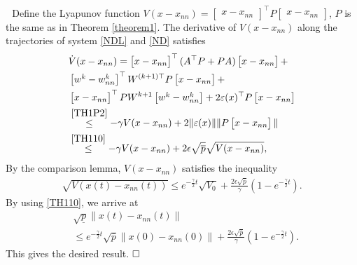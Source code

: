 \documentclass[journal,twoside,web]{ieeecolor}
\renewenvironment{proof}{\vspace{.1cm}\noindent{\sc Proof.}\hspace{0.10cm}\,\,}{$\hfill\Box$\vspace{.1cm}}
\newcommand{\hyred}[1]{{\color{red}{#1}}}
\newcommand{\bbm}[1]{\left[\begin{matrix} #1 \end{matrix}\right]}
\begin{document}
\begin{proof}
Define the Lyapunov function $V(x-x_{nn})=\bbm{x-x_{nn}}^\top P \bbm{x-x_{nn}}$, $P$ is the same as in Theorem \ref{theorem1}. The derivative of $V(x-x_{nn})$ along the 
trajectories of system \eqref{NDL} and \eqref{ND} satisfies
 \begin{equation}\label{PR2p1}
 \begin{aligned}
&\dot{V}(x-x_{nn})=\bbm{x-x_{nn}}^\top( A^\top P+PA)\bbm{x-x_{nn}}+\\&\bbm{w^k-w_{nn}^k}^\top W^{(k+1)\top}P\bbm{x-x_{nn}}+\\&\bbm{x-x_{nn}}^\top PW^{k+1}\bbm{w^k-w_{nn}^k}+2\varepsilon(x)^\top P\bbm{x-x_{nn}}\\&\overset{\eqref{TH1P2}}{\leq}-\gamma V(x-x_{nn})+2\|\varepsilon(x)\| \|P\bbm{x-x_{nn}}\|\\&\overset{\eqref{TH110}}{\leq}-\gamma V(x-x_{nn})+2\epsilon\sqrt{\overline{p}}\sqrt{V(x-x_{nn})},
\end{aligned}
\end{equation}
By the comparison lemma, $V(x-x_{nn})$ satisfies the inequality 
 \begin{equation}\label{PR2p2}
 \begin{aligned}
\sqrt{V(x(t)-x_{nn}(t))}\leq e^{-\frac{\gamma }{2}t}\sqrt{V_0}+\frac{2\epsilon\sqrt{\overline{p}}}{\gamma}(1-e^{-\frac{\gamma }{2}t}).
\end{aligned}
\end{equation}
By using \eqref{TH110}, we arrive at 
\begin{equation}\label{PR2p3}
 \begin{aligned}
&\sqrt{\underline{p}}\|x(t)-x_{nn}(t)\|\\&\leq e^{-\frac{\gamma }{2}t}\sqrt{\overline{p}}\|x(0)-x_{nn}(0)\|+\frac{2\epsilon\sqrt{\overline{p}}}{\gamma}(1-e^{-\frac{\gamma }{2}t}).
\end{aligned}
\end{equation}
This gives the desired result.
\end{proof}

\end{document}
